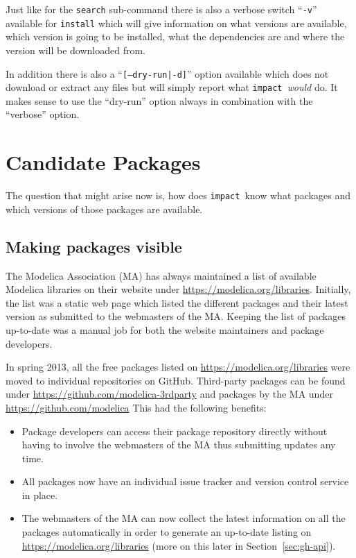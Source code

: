 \documentclass[11pt,a4paper,twocolumn]{article}
\newcommand{\impact}{\texttt{impact}} %
\newcommand{\code}[1]{\texttt{#1}} %
\begin{document}
Just like for the \code{search} sub-command there is also a verbose
switch ``\code{-v}'' available for \code{install} which will give
information on what versions are available, which version is going to
be installed, what the dependencies are and where the version will be
downloaded from.

In addition there is also a ``\code{[--dry-run|-d]}'' option available
which does not download or extract any files but will simply report
what \impact\ \emph{would} do.  It makes sense to use the ``dry-run''
option always in combination with the ``verbose'' option.



\section{Candidate Packages}
\label{sec:candidates}

The question that might arise now is, how does \impact\ know what
packages and which versions of those packages are available.

\subsection{Making packages visible}
\label{sec:collection}
The Modelica Association (MA) has always maintained a list of
available Modelica libraries on their website under
\url{https://modelica.org/libraries}.  Initially, the list was a
static web page which listed the different packages and their latest
version as submitted to the webmasters of the MA.  Keeping the list of
packages up-to-date was a manual job for both the website maintainers
and package developers.

In spring 2013, all the free packages listed on
\url{https://modelica.org/libraries} were moved to individual
repositories on GitHub. Third-party packages can be found under
\url{https://github.com/modelica-3rdparty} and packages by the MA
under \url{https://github.com/modelica} This had the following
benefits:
\begin{itemize}
\item Package developers can access their package repository directly without
having to involve the webmasters of the MA thus submitting updates any time.
\item All packages now have an individual issue tracker and version control
service in place.
\item The webmasters of the MA can now collect the latest information on all
the packages automatically in order to generate an up-to-date listing on
\url{https://modelica.org/libraries} (more on this later in
Section~\ref{sec:gh-api}).
\end{itemize}
\end{document}
